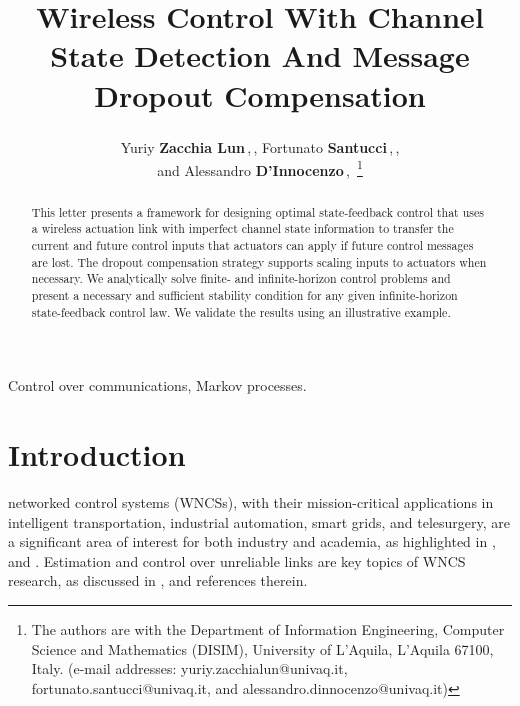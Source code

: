 \documentclass[journal,twoside,web]{ieeecolor}
\title{Wireless Control With Channel State Detection And Message Dropout Compensation}
\author{Yuriy \textbf{Zacchia Lun}\,\textsuperscript{\orcidlink{0000-0002-9408-8773}},\,\IEEEmembership{Member, IEEE}, Fortunato \textbf{Santucci}\,\textsuperscript{\orcidlink{0000-0002-0229-6277}},\,\IEEEmembership{Senior Member, IEEE},\\ and Alessandro \textbf{D'Innocenzo}\,\textsuperscript{\orcidlink{0000-0002-5239-0894}},\,\IEEEmembership{Member, IEEE}
\thanks{The authors are with the 
Department of Information Engineering, Computer Science and Mathematics (DISIM), University of L'Aquila, L'Aquila 67100, Italy. (e-mail addresses:
        {yuriy.zacchialun@univaq.it},\\ {fortunato.santucci@univaq.it}, and {alessandro.dinnocenzo@univaq.it})}%
}
\begin{document}
\maketitle
\thispagestyle{empty}
\pagestyle{empty}

\begin{abstract}
This letter presents a framework for designing optimal state-feedback control that uses a wireless actuation link with imperfect channel state information to transfer the current and future control inputs that actuators can apply if future control messages are lost. The dropout compensation strategy supports scaling inputs to actuators when necessary. We analytically solve finite- and infinite-horizon control problems and present a necessary and sufficient stability condition for any given infinite-horizon state-feedback control law. We validate the results using an illustrative example.
\end{abstract}
\begin{keywords}
Control over communications, Markov processes.
\end{keywords}
\section{Introduction}\label{sec:intro}
 networked control systems (WNCSs), with their mission-critical applications in intelligent transportation, industrial automation, smart grids, and telesurgery, are a significant area of interest for both industry and academia, as highlighted in \cite{park2018comm,liu2021iot}, and \cite{pezzutto2024arc}. Estimation and control over unreliable links are key topics of WNCS research, as discussed in \cite{park2018comm,pezzutto2024arc,yZL-2025-automatica}, and references therein. 
\end{document}
